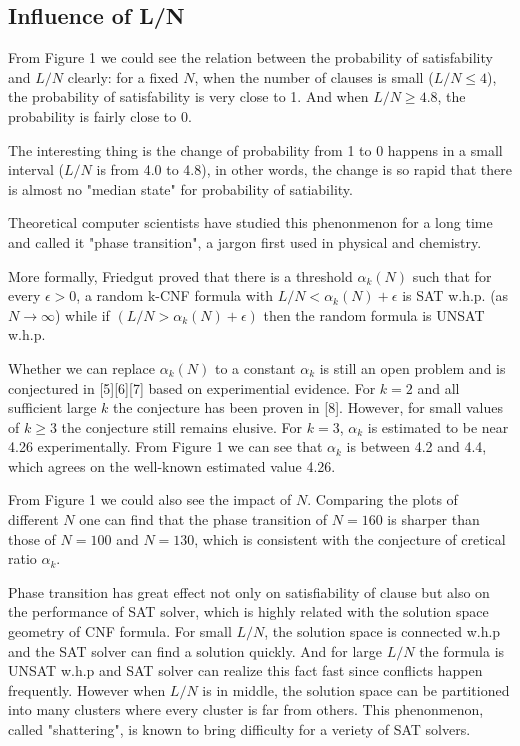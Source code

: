 \documentclass[12pt]{article}
\begin{document}
	\subsection{Influence of L/N}
	From Figure 1 we could see the relation between the probability of satisfability and $L/N$ clearly: for a fixed $N$, when the number of clauses is small ($L/N\le 4$), the probability of satisfability is very close to 1. And when $L/N\ge 4.8$, the probability is fairly close to 0.
	
	The interesting thing is the change of probability from 1 to 0 happens in a small interval ($L/N$ is from 4.0 to 4.8), in other words, the change is so rapid that there is almost no "median state" for probability of satiability.
	
	Theoretical computer scientists have studied this phenonmenon for a long time and called it "phase transition", a jargon first used in physical and chemistry. 
	
	More formally, Friedgut proved that there is a threshold $\alpha_k(N)$ such that for every $\epsilon>0$, a random k-CNF formula with $L/N<\alpha_k(N)+\epsilon$ is SAT w.h.p. (as $N\to \infty$) while if $(L/N>\alpha_k(N)+\epsilon)$ then the random formula is UNSAT w.h.p. 
	
	Whether we can replace $\alpha_k(N)$ to a constant $\alpha_k$ is still an open problem and is conjectured in [5][6][7] based on experimential evidence. For $k=2$ and all sufficient large $k$ the conjecture has been proven  in [8]. However, for small values of $k\ge 3$ the conjecture still remains elusive. For $k=3$, $\alpha_k$ is estimated to be near 4.26 experimentally. From Figure 1 we can see that $\alpha_k$ is between 4.2 and 4.4, which agrees on the well-known estimated value 4.26.
	
	From Figure 1 we could also see the impact of $N$. Comparing the plots of different $N$ one can find that the phase transition of $N=160$ is sharper than those of $N=100$ and $N=130$, which is consistent with the conjecture of cretical ratio $\alpha_k$.
	
	Phase transition has great effect not only on satisfiability of clause but also on the performance of SAT solver, which is highly related with the solution space geometry of CNF formula. For small $L/N$, the solution space is connected w.h.p and the SAT solver can find a solution quickly. And for large $L/N$ the formula is UNSAT w.h.p and SAT solver can realize this fact fast since conflicts happen frequently. However when $L/N$ is in middle, the solution space can be partitioned into many clusters where every cluster is far from  others. This phenonmenon, called "shattering", is known to bring difficulty for a veriety of SAT solvers.\label{key}
	
\end{document}
